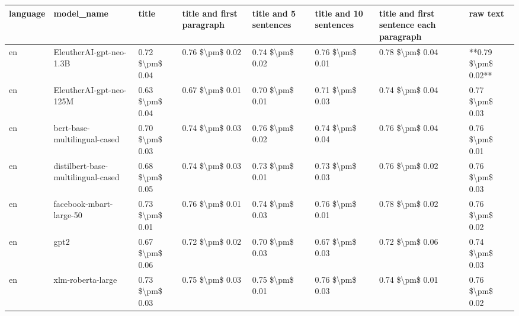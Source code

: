 \begin{tabular}{llllllll}
\toprule
language &                         model\_name &           title & title and first paragraph & title and 5 sentences & title and 10 sentences & title and first sentence each paragraph &            raw text \\
\midrule
      en &            EleutherAI-gpt-neo-1.3B & 0.72 \$\textbackslash pm\$ 0.04 &           0.76 \$\textbackslash pm\$ 0.02 &       0.74 \$\textbackslash pm\$ 0.02 &        0.76 \$\textbackslash pm\$ 0.01 &                         0.78 \$\textbackslash pm\$ 0.04 & **0.79 \$\textbackslash pm\$ 0.02** \\
      en &            EleutherAI-gpt-neo-125M & 0.63 \$\textbackslash pm\$ 0.04 &           0.67 \$\textbackslash pm\$ 0.01 &       0.70 \$\textbackslash pm\$ 0.01 &        0.71 \$\textbackslash pm\$ 0.03 &                         0.74 \$\textbackslash pm\$ 0.04 &     0.77 \$\textbackslash pm\$ 0.03 \\
      en &       bert-base-multilingual-cased & 0.70 \$\textbackslash pm\$ 0.03 &           0.74 \$\textbackslash pm\$ 0.03 &       0.76 \$\textbackslash pm\$ 0.02 &        0.74 \$\textbackslash pm\$ 0.04 &                         0.76 \$\textbackslash pm\$ 0.04 &     0.76 \$\textbackslash pm\$ 0.01 \\
      en & distilbert-base-multilingual-cased & 0.68 \$\textbackslash pm\$ 0.05 &           0.74 \$\textbackslash pm\$ 0.03 &       0.73 \$\textbackslash pm\$ 0.01 &        0.73 \$\textbackslash pm\$ 0.03 &                         0.76 \$\textbackslash pm\$ 0.02 &     0.76 \$\textbackslash pm\$ 0.03 \\
      en &            facebook-mbart-large-50 & 0.73 \$\textbackslash pm\$ 0.01 &           0.76 \$\textbackslash pm\$ 0.01 &       0.74 \$\textbackslash pm\$ 0.03 &        0.76 \$\textbackslash pm\$ 0.01 &                         0.78 \$\textbackslash pm\$ 0.02 &     0.76 \$\textbackslash pm\$ 0.02 \\
      en &                               gpt2 & 0.67 \$\textbackslash pm\$ 0.06 &           0.72 \$\textbackslash pm\$ 0.02 &       0.70 \$\textbackslash pm\$ 0.03 &        0.67 \$\textbackslash pm\$ 0.03 &                         0.72 \$\textbackslash pm\$ 0.06 &     0.74 \$\textbackslash pm\$ 0.03 \\
      en &                  xlm-roberta-large & 0.73 \$\textbackslash pm\$ 0.03 &           0.75 \$\textbackslash pm\$ 0.03 &       0.75 \$\textbackslash pm\$ 0.01 &        0.76 \$\textbackslash pm\$ 0.03 &                         0.74 \$\textbackslash pm\$ 0.01 &     0.76 \$\textbackslash pm\$ 0.02 \\

\end{tabular}
